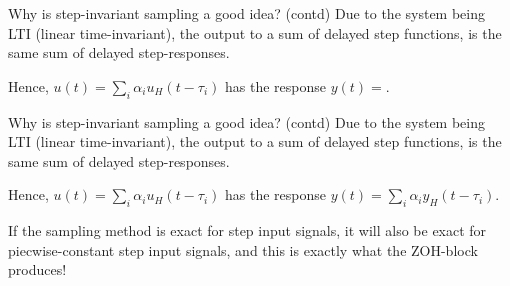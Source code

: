 \documentclass[presentation,aspectratio=169]{beamer}
\begin{document}
\begin{frame}[label=sec-3-4]{Why is step-invariant sampling a good idea? (contd)}
Due to the system being LTI (linear time-invariant), the output to a sum of delayed step functions, is the same sum of delayed step-responses.

\begin{center}
\end{center}
Hence, $u(t) = \sum_{i} \alpha_i u_H(t-\tau_i)$ has the response \(y(t)=\). 
\end{frame}

\begin{frame}[label=sec-3-5]{Why is step-invariant sampling a good idea? (contd)}
Due to the system being LTI (linear time-invariant), the output to a sum of delayed step functions, is the same sum of delayed step-responses.

\begin{center}
\end{center}
Hence, $u(t) = \sum_{i} \alpha_i u_H(t-\tau_i)$ has the response $y(t) = \sum_i \alpha_i y_H(t-\tau_i)$. 

\alert{If the sampling method is exact for step input signals, it will also be exact for piecwise-constant step input signals, and this is exactly what the ZOH-block produces!}
\end{frame}
\end{document}
